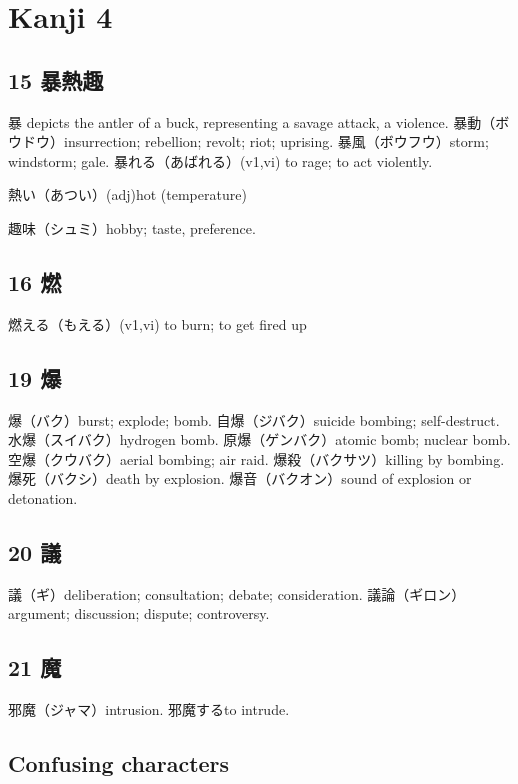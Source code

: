 \chapter{Kanji 4}

\section{15 暴熱趣}

暴 depicts the antler of a buck, representing a savage attack, a violence.
暴動（ボウドウ）insurrection; rebellion; revolt; riot; uprising.
暴風（ボウフウ）storm; windstorm; gale.
暴れる（あばれる）(v1,vi) to rage; to act violently.

熱い（あつい）(adj)hot (temperature)

趣味（シュミ）hobby; taste, preference.

\section{16 燃}

燃える（もえる）(v1,vi) to burn; to get fired up

\section{19 爆}

爆（バク）burst; explode; bomb.
自爆（ジバク）suicide bombing; self-destruct.
水爆（スイバク）hydrogen bomb.
原爆（ゲンバク）atomic bomb; nuclear bomb.
空爆（クウバク）aerial bombing; air raid.
爆殺（バクサツ）killing by bombing.
爆死（バクシ）death by explosion.
爆音（バクオン）sound of explosion or detonation.

\section{20 議}

議（ギ）deliberation; consultation; debate; consideration.
議論（ギロン）argument; discussion; dispute; controversy.

\section{21 魔}

邪魔（ジャマ）intrusion.
邪魔するto intrude.

\section{Confusing characters}

